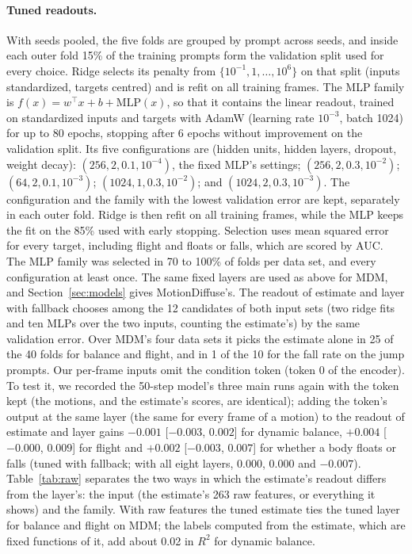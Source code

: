 \paragraph{Tuned readouts.} With seeds pooled, the five folds are grouped by prompt across seeds, and inside each outer fold 15\% of the training prompts form the validation split used for every choice. Ridge selects its penalty from $\{10^{-1}, 1, \dots, 10^{6}\}$ on that split (inputs standardized, targets centred) and is refit on all training frames. The MLP family is $f(x) = w^\top x + b + \mathrm{MLP}(x)$, so that it contains the linear readout, trained on standardized inputs and targets with AdamW (learning rate $10^{-3}$, batch 1024) for up to 80 epochs, stopping after 6 epochs without improvement on the validation split. Its five configurations are (hidden units, hidden layers, dropout, weight decay): $(256, 2, 0.1, 10^{-4})$, the fixed MLP's settings; $(256, 2, 0.3, 10^{-2})$; $(64, 2, 0.1, 10^{-3})$; $(1024, 1, 0.3, 10^{-2})$; and $(1024, 2, 0.3, 10^{-3})$. The configuration and the family with the lowest validation error are kept, separately in each outer fold. Ridge is then refit on all training frames, while the MLP keeps the fit on the 85\% used with early stopping. Selection uses mean squared error for every target, including flight and floats or falls, which are scored by AUC. The MLP family was selected in 70 to 100\% of folds per data set, and every configuration at least once. The same fixed layers are used as above for MDM, and Section~\ref{sec:models} gives MotionDiffuse's. The readout of estimate and layer with fallback chooses among the 12 candidates of both input sets (two ridge fits and ten MLPs over the two inputs, counting the estimate's) by the same validation error. Over MDM's four data sets it picks the estimate alone in 25 of the 40 folds for balance and flight, and in 1 of the 10 for the fall rate on the jump prompts. Our per-frame inputs omit the condition token (token 0 of the encoder). To test it, we recorded the 50-step model's three main runs again with the token kept (the motions, and the estimate's scores, are identical); adding the token's output at the same layer (the same for every frame of a motion) to the readout of estimate and layer gains $-0.001$ [$-0.003$, $0.002$] for dynamic balance, $+0.004$ [$-0.000$, $0.009$] for flight and $+0.002$ [$-0.003$, $0.007$] for whether a body floats or falls (tuned with fallback; with all eight layers, $0.000$, $0.000$ and $-0.007$). Table~\ref{tab:raw} separates the two ways in which the estimate's readout differs from the layer's: the input (the estimate's 263 raw features, or everything it shows) and the family. With raw features the tuned estimate ties the tuned layer for balance and flight on MDM; the labels computed from the estimate, which are fixed functions of it, add about 0.02 in $R^2$ for dynamic balance.

